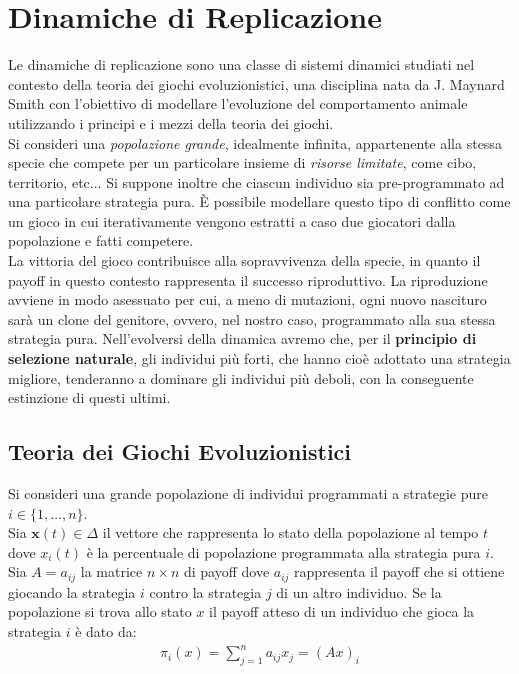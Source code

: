 
\chapter{Dinamiche di Replicazione} %
\label{cha:dinamiche_di_replicazione}
Le dinamiche di replicazione sono una classe di sistemi dinamici studiati nel contesto della teoria dei giochi evoluzionistici, una disciplina nata da J. Maynard Smith con l’obiettivo di modellare l’evoluzione del comportamento animale utilizzando i principi e i mezzi della teoria dei giochi.\\

Si consideri una \emph{popolazione grande}, idealmente infinita, appartenente alla stessa specie che compete per un particolare insieme di \emph{risorse limitate}, come cibo, territorio, etc... Si suppone inoltre che ciascun individuo sia pre-programmato ad una particolare strategia pura. È possibile modellare questo tipo di conflitto come un gioco in cui iterativamente vengono estratti a caso due giocatori dalla popolazione e fatti competere.\\

La vittoria del gioco contribuisce alla sopravvivenza della specie, in quanto il payoff in questo contesto rappresenta il successo riproduttivo. La riproduzione avviene in modo asessuato per cui, a meno di mutazioni, ogni nuovo nascituro sarà un clone del genitore, ovvero, nel nostro caso, programmato alla sua stessa strategia pura. Nell’evolversi della dinamica avremo che, per il \textbf{principio di selezione naturale}, gli individui più forti, che hanno cioè adottato una strategia migliore, tenderanno a dominare gli individui più deboli, con la conseguente estinzione di questi ultimi.

\newpage

\section{Teoria dei Giochi Evoluzionistici} %
\label{sec:teoria_dei_giochi_evoluzionistici}
Si consideri una grande popolazione di individui programmati a strategie pure $i \in \{1, \dots, n\}$.\\

Sia $\mathbf{x}(t) \in \Delta$ il vettore che rappresenta lo stato della popolazione al tempo $t$ dove $x_i(t)$ è la percentuale di popolazione programmata alla strategia pura $i$. Sia $A=a_{ij}$ la matrice $n \times n$ di payoff dove $a_{ij}$ rappresenta il payoff che si ottiene giocando la strategia $i$ contro la strategia $j$ di un altro individuo. Se la popolazione si trova allo stato $x$ il payoff atteso di un individuo che gioca la strategia $i$ è dato da:
\begin{align}
	\pi_i (x) = \sum_{j=1}^n a_{ij} x_j = (Ax)_i
\end{align}

